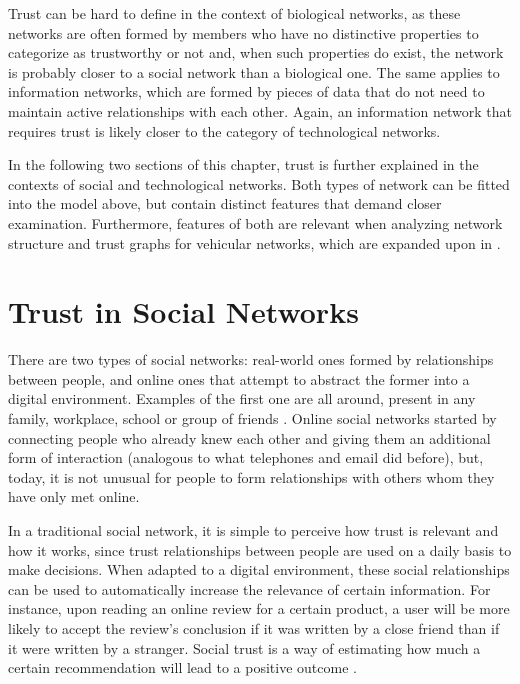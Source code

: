 Trust can be hard to define in the context of biological networks, as these networks are often formed by members who have no distinctive properties to categorize as trustworthy or not and, when such properties do exist, the network is probably closer to a social network than a biological one.
The same applies to information networks, which are formed by pieces of data that do not need to maintain active relationships with each other.
Again, an information network that requires trust is likely closer to the category of technological networks.

In the following two sections of this chapter, trust is further explained in the contexts of social and technological networks.
Both types of network can be fitted into the model above, but contain distinct features that demand closer examination.
Furthermore, features of both are relevant when analyzing network structure and trust graphs for vehicular networks, which are expanded upon in .


\section{Trust in Social Networks}
\label{section:trustsocial}
There are two types of social networks: real-world ones formed by relationships between people, and online ones that attempt to abstract the former into a digital environment.
Examples of the first one are all around, present in any family, workplace, school or group of friends \citep{newmannetworks}.
Online social networks started by connecting people who already knew each other and giving them an additional form of interaction (analogous to what telephones and email did before), but, today, it is not unusual for people to form relationships with others whom they have only met online. 

In a traditional social network, it is simple to perceive how trust is relevant and how it works, since trust relationships between people are used on a daily basis to make decisions.
When adapted to a digital environment, these social relationships can be used to automatically increase the relevance of certain information.
For instance, upon reading an online review for a certain product, a user will be more likely to accept the review's conclusion if it was written by a close friend than if it were written by a stranger.
Social trust is a way of estimating how much a certain recommendation will lead to a positive outcome \citep{golbeck2006inferring}. 

